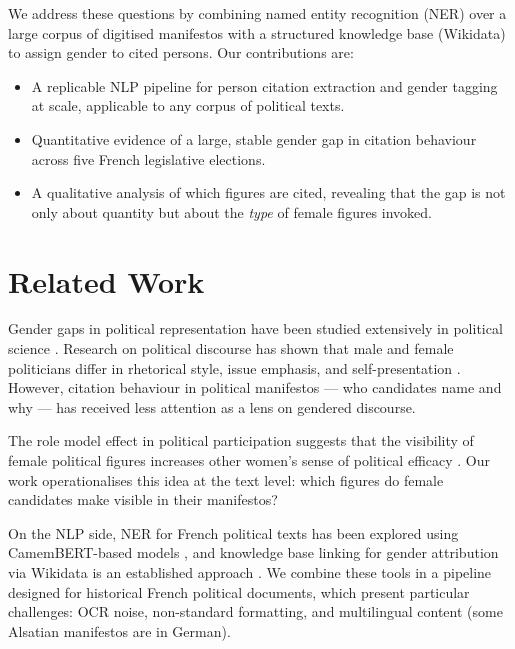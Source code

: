 \documentclass{article}
\begin{document}
We address these questions by combining named entity recognition (NER) over a large
corpus of digitised manifestos with a structured knowledge base (Wikidata) to
assign gender to cited persons. Our contributions are:

\begin{itemize}
  \item A replicable NLP pipeline for person citation extraction and gender tagging
        at scale, applicable to any corpus of political texts.
  \item Quantitative evidence of a large, stable gender gap in citation behaviour
        across five French legislative elections.
  \item A qualitative analysis of which figures are cited, revealing that the gap is
        not only about quantity but about the \emph{type} of female figures invoked.
\end{itemize}


\section{Related Work}

Gender gaps in political representation have been studied extensively in political
science \cite{norris1997passages, celis2008}. Research on political discourse has
shown that male and female politicians differ in rhetorical style, issue emphasis,
and self-presentation \cite{lawless2004}. However, citation behaviour in political
manifestos — who candidates name and why — has received less attention as a lens on
gendered discourse.

The role model effect in political participation suggests that the visibility of
female political figures increases other women's sense of political efficacy
\cite{campbell2010}. Our work operationalises this idea at the text level: which
figures do female candidates make visible in their manifestos?

On the NLP side, NER for French political texts has been explored using
CamemBERT-based models \cite{martin2020camembert}, and knowledge base linking for
gender attribution via Wikidata is an established approach \cite{wagner2016}. We
combine these tools in a pipeline designed for historical French political documents,
which present particular challenges: OCR noise, non-standard formatting, and
multilingual content (some Alsatian manifestos are in German).
\end{document}
